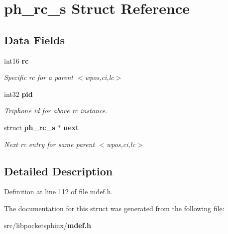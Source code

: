 \section{ph\+\_\+rc\+\_\+s Struct Reference}
\label{structph__rc__s}
\subsection*{Data Fields}
\begin{DoxyCompactItemize}
\item 
int16 {\bf rc}\label{structph__rc__s_ab0f0852e254c04a1cb11de805b698733}

\begin{DoxyCompactList}\small\item\em Specific rc for a parent $<$wpos,ci,lc$>$ \end{DoxyCompactList}\item 
int32 {\bf pid}\label{structph__rc__s_a9762d0f7b4b9f284fd2b3ff735b4256b}

\begin{DoxyCompactList}\small\item\em Triphone id for above rc instance. \end{DoxyCompactList}\item 
struct {\bf ph\+\_\+rc\+\_\+s} $\ast$ {\bf next}\label{structph__rc__s_ae05aead721c5cfdd27ac90378bb80f3c}

\begin{DoxyCompactList}\small\item\em Next rc entry for same parent $<$wpos,ci,lc$>$ \end{DoxyCompactList}\end{DoxyCompactItemize}


\subsection{Detailed Description}


Definition at line 112 of file mdef.\+h.



The documentation for this struct was generated from the following file\+:\begin{DoxyCompactItemize}
\item 
src/libpocketsphinx/{\bf mdef.\+h}\end{DoxyCompactItemize}
